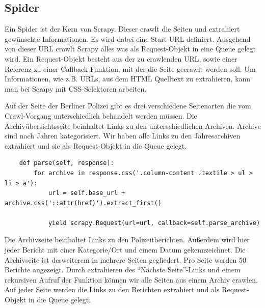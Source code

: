 \documentclass[chapterprefix=false, 12pt, a4paper, oneside, parskip=half, listof=totoc, bibliography=totoc, numbers=noendperiod]{scrbook}
\begin{document}
    \subsection{Spider}

    Ein Spider ist der Kern von Scrapy. Dieser crawlt die Seiten und extrahiert gewünschte Informationen.
    Es wird dabei eine Start-URL definiert. Ausgehend von dieser URL crawlt Scrapy alles was als Request-Objekt in
    eine Queue gelegt wird. Ein Request-Objekt besteht aus der zu crawlenden URL, sowie einer Referenz zu einer Callback-Funktion,
    mit der die Seite gecrawlt werden soll. Um Informationen, wie z.B. URLs, aus dem HTML Quelltext zu extrahieren, kann man bei Scrapy
    mit CSS-Selektoren arbeiten.

    Auf der Seite der Berliner Polizei gibt es drei verschiedene Seitenarten die vom Crawl-Vorgang
    unterschiedlich behandelt werden müssen. Die Archivübersichtsseite beinhaltet Links zu den unterschiedlichen Archiven.
    Archive sind nach Jahren kategorisiert. Wir haben alle Links zu den Jahresarchiven extrahiert und sie als Request-Objekt in die Queue gelegt.

    \begin{verbatim}
    def parse(self, response):
        for archive in response.css('.column-content .textile > ul > li > a'):
            url = self.base_url + archive.css('::attr(href)').extract_first()

            yield scrapy.Request(url=url, callback=self.parse_archive)
    \end{verbatim}

    Die Archivseite beinhaltet Links zu den Polizeitberichten. Außerdem wird hier jeder Bericht mit einer Kategorie/Ort
    und einem Datum gekennzeichnet. Die Archivseite ist desweiterem in mehrere Seiten gegliedert. Pro Seite werden 50 Berichte angezeigt.
    Durch extrahieren des "`Nächste Seite"'-Links und einem rekursiven Aufruf der Funktion können wir alle Seiten aus einem
    Archiv crawlen. Auf jeder Seite werden die Links zu den Berichten extrahiert und als Request-Objekt in die Queue gelegt.
\end{document}
